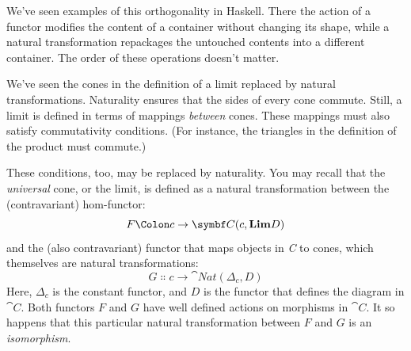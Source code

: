 \begin{figure}[H]
\centering
{}
\end{figure}

\noindent
We've seen examples of this orthogonality in Haskell. There the action
of a functor modifies the content of a container without changing its
shape, while a natural transformation repackages the untouched contents
into a different container. The order of these operations doesn't
matter.

We've seen the cones in the definition of a limit replaced by natural
transformations. Naturality ensures that the sides of every cone
commute. Still, a limit is defined in terms of mappings \emph{between}
cones. These mappings must also satisfy commutativity conditions. (For
instance, the triangles in the definition of the product must commute.)

These conditions, too, may be replaced by naturality. You may recall
that the \emph{universal} cone, or the limit, is defined as a natural
transformation between the (contravariant) hom-functor:
\[F \Colon c \to \cat{C}(c, \Lim[D])\]
and the (also contravariant) functor that maps objects in \emph{C} to
cones, which themselves are natural transformations:
\[G \Colon c \to \cat{Nat}(\Delta_c, D)\]
Here, $\Delta_c$ is the constant functor, and $D$ is the functor
that defines the diagram in $\cat{C}$. Both functors $F$ and
$G$ have well defined actions on morphisms in $\cat{C}$. It so
happens that this particular natural transformation between $F$
and $G$ is an \emph{isomorphism}.

